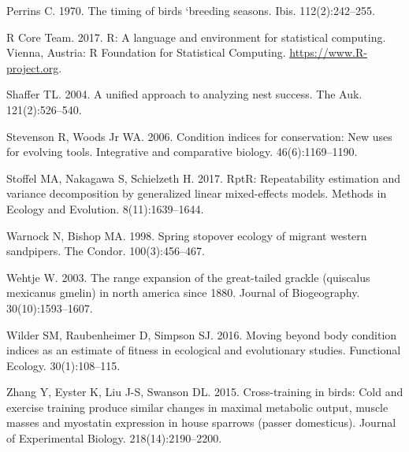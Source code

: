 \documentclass[
]{article}
\begin{document}
\leavevmode\hypertarget{ref-perrins1970timing}{}%
Perrins C. 1970. The timing of birds `breeding seasons. Ibis.
112(2):242--255.

\leavevmode\hypertarget{ref-rcoreteam}{}%
R Core Team. 2017. R: A language and environment for statistical
computing. Vienna, Austria: R Foundation for Statistical Computing.
\url{https://www.R-project.org}.

\leavevmode\hypertarget{ref-shaffer2004unified}{}%
Shaffer TL. 2004. A unified approach to analyzing nest success. The Auk.
121(2):526--540.

\leavevmode\hypertarget{ref-stevenson2006condition}{}%
Stevenson R, Woods Jr WA. 2006. Condition indices for conservation: New
uses for evolving tools. Integrative and comparative biology.
46(6):1169--1190.

\leavevmode\hypertarget{ref-stoffel2017rptr}{}%
Stoffel MA, Nakagawa S, Schielzeth H. 2017. RptR: Repeatability
estimation and variance decomposition by generalized linear
mixed-effects models. Methods in Ecology and Evolution.
8(11):1639--1644.

\leavevmode\hypertarget{ref-warnock1998spring}{}%
Warnock N, Bishop MA. 1998. Spring stopover ecology of migrant western
sandpipers. The Condor. 100(3):456--467.

\leavevmode\hypertarget{ref-wehtje2003range}{}%
Wehtje W. 2003. The range expansion of the great-tailed grackle
(quiscalus mexicanus gmelin) in north america since 1880. Journal of
Biogeography. 30(10):1593--1607.

\leavevmode\hypertarget{ref-wilder2016moving}{}%
Wilder SM, Raubenheimer D, Simpson SJ. 2016. Moving beyond body
condition indices as an estimate of fitness in ecological and
evolutionary studies. Functional Ecology. 30(1):108--115.

\leavevmode\hypertarget{ref-zhang2015cross}{}%
Zhang Y, Eyster K, Liu J-S, Swanson DL. 2015. Cross-training in birds:
Cold and exercise training produce similar changes in maximal metabolic
output, muscle masses and myostatin expression in house sparrows (passer
domesticus). Journal of Experimental Biology. 218(14):2190--2200.
\end{document}
